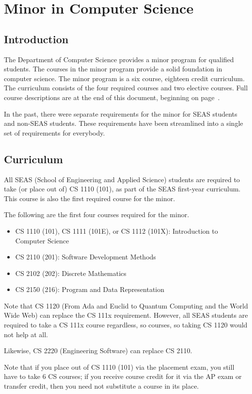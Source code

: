 \documentclass[10pt,letter]{book}
\newenvironment{itemlist}{
\begin{itemize}
\setlength{\itemsep}{0pt}
\setlength{\parskip}{0pt}}
{\end{itemize}}
\newcommand{\mychapter}[2]{\chapter{#1}\renewcommand{\leftmark}{\textsc{#2}}}
\newcommand{\mysection}[1]{\section{#1}\renewcommand{\rightmark}{#1}}
\begin{document}
\begin{figure}[h!]
\end{figure}


\clearpage
\mychapter{Minor in Computer Science}{CS Minor}
\label{sec:csminor}

\mysection{Introduction}

The Department of Computer Science provides a minor program for
qualified students. The courses in the minor program provide a solid
foundation in computer science. The minor program is a six course,
eighteen credit curriculum. The curriculum consists of the four
required courses and two elective courses. Full course descriptions
are at the end of this document, beginning on
page~\pageref{sec:coursedesc}.

In the past, there were separate requirements for the minor for SEAS
students and non-SEAS students.  These requirements have been
streamlined into a single set of requirements for everybody.
 
\mysection{Curriculum}

All SEAS (School of Engineering and Applied Science) students are
required to take (or place out of) CS 1110 (101), as part of the SEAS
first-year curriculum. This course is also the first required course
for the minor.

The following are the first four courses required for the minor.

\begin{itemlist} 
\item CS 1110 (101), CS 1111 (101E), or CS 1112 (101X): Introduction
  to Computer Science
\item CS 2110 (201): Software Development Methods
\item CS 2102 (202): Discrete Mathematics
\item CS 2150 (216): Program and Data Representation
\end{itemlist}

Note that CS 1120 (From Ada and Euclid to Quantum Computing and the
World Wide Web) can replace the CS 111x requirement.  However, all
SEAS students are required to take a CS 111x course regardless, so
courses, so taking CS 1120 would not help at all.

Likewise, CS 2220 (Engineering Software) can replace CS 2110.

Note that if you place out of CS 1110 (101) via the placement exam,
you still have to take 6 CS courses; if you receive course credit for
it via the AP exam or transfer credit, then you need not substitute a
course in its place.
\end{document}
